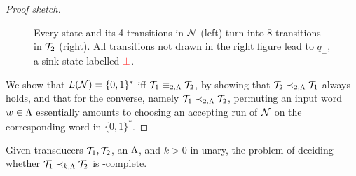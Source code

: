 \begin{proof}[Proof sketch]
\begin{figure}
\begin{minipage}{.65\linewidth}
 	\caption{Every state and its 4 transitions in $\mathcal{N}$ (left) turn into 8 transitions in $\mathcal{T}_2$ (right). All transitions not drawn in the right figure lead to $q_\bot$, a sink state labelled $\color{red}\bot$.}
 	\label{fig:PSPACE_reduction_T2}
 \end{minipage}
\end{figure}

We show that $L(\mathcal{N})=\{0,1\}^*$ iff $\mathcal{T}_1\equiv_{2,\Lambda}\mathcal{T}_2$, by showing that $\mathcal{T}_2\prec_{2,\Lambda}\mathcal{T}_1$ always holds, and that for the converse, namely $\mathcal{T}_1\prec_{2,\Lambda}\mathcal{T}_2$, permuting an input word $w\in \Lambda$ essentially amounts to choosing an accepting run of $\mathcal{N}$ on the corresponding word in $\{0,1\}^*$.
\end{proof}

\begin{corollary}
\label{cor:PSPACE-C}
Given transducers $\mathcal{T}_1,\mathcal{T}_2$, an \NFA $\Lambda$, and $k>0$ in unary, the problem of deciding whether $\mathcal{T}_1\prec_{k,\Lambda}\mathcal{T}_2$ is \PSPACE-complete.
\end{corollary}
